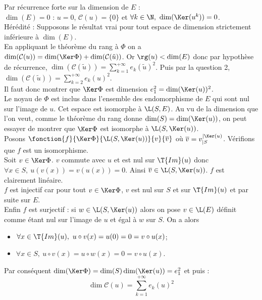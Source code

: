\documentclass[8pt]{book}
\begin{document}
\begin{enumerate}[leftmargin=*]
		Par récurrence forte sur la dimension de $E$ :\\
		$\dim(E)=0$ : $u=0$, $\mathcal C(u)=\{0\}$ et $\forall k\in \N,\ \dim(\Ker(u^k))=0$.\\
		Hérédité : Supposons le résultat vrai pour tout espace de dimension strictement inférieure à $\dim(E)$.\\
		En appliquant le théorème du rang à $\Phi$ on a $\dim(\mathcal C(u))=\dim(\Ker \Phi)+\dim(\mathcal C(\tilde u))$. Or $\rg(u)<\dim(E)$ donc par hypothèse de récurrence, $\dim(\mathcal C(\tilde u))=\displaystyle\sum_{k=1}^{+\infty}e_k(\tilde u)^2$. Puis par la question 2, $\dim(\mathcal C(\tilde u))=\displaystyle\sum_{k=2}^{+\infty}e_k(u)^2$.\\
		Il faut donc montrer que $\Ker\Phi$ est dimension $e_1^2=\dim(\Ker(u))^2$.\\
		Le noyau de $\Phi$ est inclus dans l'ensemble des endomorphisme de $E$ qui sont nul sur l'image de $u$. Cet espace est isomorphe à $\L(S,E)$. Au vu de la dimension que l'on veut, comme le théorème du rang donne $\dim(S)=\dim(\Ker(u))$, on peut essayer de montrer que $\Ker\Phi$ est isomorphe à $\L(S,\Ker(u))$.\\
		Posons $\fonction{f}{\Ker\Phi}{\L(S,\Ker(u))}{v}{\overline v}$ où $\overline v=v_{|S}^{|\Ker(u)}$. Vérifions que $f$ est un isomorphisme.\\
		Soit $v\in \Ker\Phi$. $v$ commute avec $u$ et est nul sur $\T{Im}(u)$ donc $\forall x\in S,\ u(v(x))=v(u(x))=0$. Ainsi $\overline v\in \L(S,\Ker(u))$. $f$ est clairement linéaire.\\
		$f$ est injectif car pour tout $v\in \Ker\Phi$, $v$ est nul sur $S$ et sur $\T{Im}(u)$ et par suite sur $E$.\\
		Enfin $f$ est surjectif : si $w\in \L(S,\Ker(u))$ alors on pose $v\in \L(E)$ définit comme étant nul sur l'image de $u$ et égal à $w$ sur $S$. On a alors
		\begin{itemize}
			\item $\forall x\in \T{Im}(u),\ u\circ v(x)=u(0)=0=v\circ u(x)$;
			\item $\forall x\in S,\ u\circ v(x)=u\circ w(x)=0=v\circ u(x)$.
		\end{itemize}
		Par conséquent $\dim(\Ker\Phi)=\dim(S)\dim(\Ker(u))=e_1^2$ et puis :
		$$\dim\mathcal C(u)=\sum_{k=1}^{+\infty}e_k(u)^2$$
	\end{enumerate}
	
\end{document}

